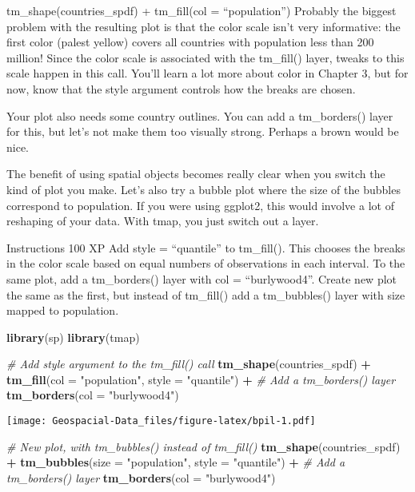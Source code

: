 \documentclass[]{article}
\newenvironment{Shaded}{\begin{snugshade}}{\end{snugshade}}
\newcommand{\CommentTok}[1]{\textcolor[rgb]{0.56,0.35,0.01}{\textit{#1}}}
\newcommand{\DataTypeTok}[1]{\textcolor[rgb]{0.13,0.29,0.53}{#1}}
\newcommand{\KeywordTok}[1]{\textcolor[rgb]{0.13,0.29,0.53}{\textbf{#1}}}
\newcommand{\NormalTok}[1]{#1}
\newcommand{\OperatorTok}[1]{\textcolor[rgb]{0.81,0.36,0.00}{\textbf{#1}}}
\newcommand{\StringTok}[1]{\textcolor[rgb]{0.31,0.60,0.02}{#1}}
\begin{document}
tm\_shape(countries\_spdf) + tm\_fill(col = ``population'') Probably the
biggest problem with the resulting plot is that the color scale isn't
very informative: the first color (palest yellow) covers all countries
with population less than 200 million! Since the color scale is
associated with the tm\_fill() layer, tweaks to this scale happen in
this call. You'll learn a lot more about color in Chapter 3, but for
now, know that the style argument controls how the breaks are chosen.

Your plot also needs some country outlines. You can add a tm\_borders()
layer for this, but let's not make them too visually strong. Perhaps a
brown would be nice.

The benefit of using spatial objects becomes really clear when you
switch the kind of plot you make. Let's also try a bubble plot where the
size of the bubbles correspond to population. If you were using ggplot2,
this would involve a lot of reshaping of your data. With tmap, you just
switch out a layer.

Instructions 100 XP Add style = ``quantile'' to tm\_fill(). This chooses
the breaks in the color scale based on equal numbers of observations in
each interval. To the same plot, add a tm\_borders() layer with col =
``burlywood4''. Create new plot the same as the first, but instead of
tm\_fill() add a tm\_bubbles() layer with size mapped to population.

\begin{Shaded}
\begin{Highlighting}[]
\KeywordTok{library}\NormalTok{(sp)}
\KeywordTok{library}\NormalTok{(tmap)}

\CommentTok{# Add style argument to the tm_fill() call}
\KeywordTok{tm_shape}\NormalTok{(countries_spdf) }\OperatorTok{+}
\StringTok{  }\KeywordTok{tm_fill}\NormalTok{(}\DataTypeTok{col =} \StringTok{"population"}\NormalTok{, }\DataTypeTok{style =} \StringTok{"quantile"}\NormalTok{) }\OperatorTok{+}
\StringTok{  }\CommentTok{# Add a tm_borders() layer }
\StringTok{  }\KeywordTok{tm_borders}\NormalTok{(}\DataTypeTok{col =} \StringTok{"burlywood4"}\NormalTok{)}
\end{Highlighting}
\end{Shaded}

\texttt{[image: Geospacial-Data\_files/figure-latex/bpil-1.pdf]}

\begin{Shaded}
\begin{Highlighting}[]
\CommentTok{# New plot, with tm_bubbles() instead of tm_fill()}
\KeywordTok{tm_shape}\NormalTok{(countries_spdf) }\OperatorTok{+}
\StringTok{  }\KeywordTok{tm_bubbles}\NormalTok{(}\DataTypeTok{size =} \StringTok{"population"}\NormalTok{, }\DataTypeTok{style =} \StringTok{"quantile"}\NormalTok{) }\OperatorTok{+}
\StringTok{  }\CommentTok{# Add a tm_borders() layer }
\StringTok{  }\KeywordTok{tm_borders}\NormalTok{(}\DataTypeTok{col =} \StringTok{"burlywood4"}\NormalTok{)}
\end{Highlighting}
\end{Shaded}
\end{document}
